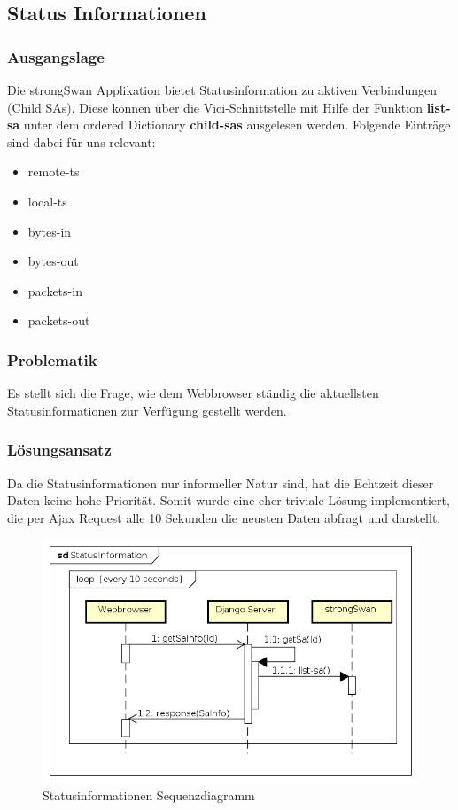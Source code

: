 \subsection{Status Informationen}
\subsubsection{Ausgangslage}
Die strongSwan Applikation bietet Statusinformation zu aktiven Verbindungen (Child SAs). Diese können über die Vici-Schnittstelle mit Hilfe der Funktion \textbf{list-sa} unter dem ordered Dictionary \textbf{child-sas} ausgelesen werden. Folgende Einträge sind dabei für uns relevant:
\begin{itemize}
    \item remote-ts
    \item local-ts
    \item bytes-in
    \item bytes-out
    \item packets-in
    \item packets-out
\end{itemize}

\subsubsection{Problematik}
Es stellt sich die Frage, wie dem Webbrowser ständig die aktuellsten Statusinformationen zur Verfügung gestellt werden. 

\subsubsection{Lösungsansatz}
Da die Statusinformationen nur informeller Natur sind, hat die Echtzeit dieser Daten keine hohe Priorität. Somit wurde eine eher triviale Lösung implementiert, die per Ajax Request alle 10 Sekunden die neusten Daten abfragt und darstellt.
\begin{figure}[H]
\centering
\includegraphics[width=320pt]{images/StatusInformation.png}
\caption[Statusinformationen Sequenzdiagramm]{Statusinformationen Sequenzdiagramm}
\end{figure}

\newpage